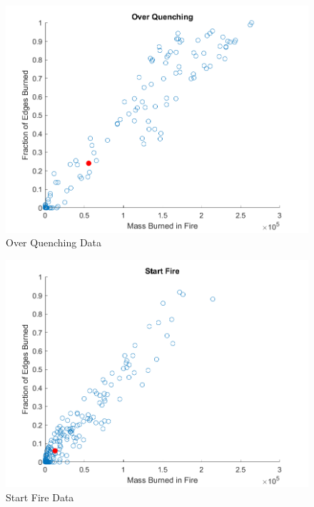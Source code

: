 \documentclass[ aps, pra, reprint, notitlepage ]{revtex4-1}
\begin{document}
\begin{figure}[ht]
	\includegraphics[scale=0.6]{Data/OverQuenching}
	\caption{\label{OverQuenching} Over Quenching Data}
\end{figure}
\begin{figure}[ht]
	\includegraphics[scale=0.6]{Data/StartFire}
	\caption{\label{StartFire} Start Fire Data}
\end{figure}
\end{document}

